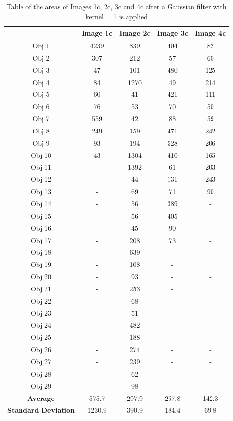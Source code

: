 \documentclass[runningheads]{llncs}
\begin{document}
\begin{table}[h!]
\centering
\begin{tabular}{|c|c|c|c|c|}
\hline
\textbf{} & \textbf{Image 1c} & \textbf{Image 2c} & \textbf{Image 3c} & \textbf{Image 4c} \\
\hline
Obj 1 & 4239   & 839 & 404 &  82 \\ \hline
Obj 2 &  307   & 212  & 57 &  60\\ \hline
Obj 3 &  47    & 101  & 480 &  125\\ \hline
Obj 4 &  84    & 1270  & 49 &  214\\ \hline
Obj 5 &  60    & 41   & 421 &  111\\ \hline
Obj 6 &   76   &  53  & 70 &  50\\ \hline
Obj 7 &  559   &  42     & 88 &  59\\ \hline
Obj 8 &   249  &   159  & 471 &  242 \\ \hline
Obj 9 &  93    &    194   &   528   &  206\\ \hline
Obj 10 & 43    &     1304  &   410  &  165\\ \hline
Obj 11 &  -     &   1392   &   61 &  203\\ \hline
Obj 12 &  -  &     44  &      131  &  243\\ \hline
Obj 13 &  -     &  69   &    71  &  90\\ \hline
Obj 14 &  -  &     56 &    389  &   -\\ \hline
Obj 15 &  -   &    56   &   405   & -  \\ \hline
Obj 16 &  -   &    45 &     90 &   - \\ \hline
Obj 17 &  -    &   208   &   73   & - \\ \hline
Obj 18 &  -   &    639  &    -  &  - \\ \hline
Obj 19 &  -     &    108   &   -   &  \\ \hline
Obj 20 &  - &     93  &  -    & - \\ \hline
Obj 21 &  -     &   253   &    -  &  \\ \hline
Obj 22 & -   &     68  &   -   & - \\ \hline
Obj 23 &  -  &    51   &  -    & - \\ \hline
Obj 24 &  -  &     482  & -     & - \\ \hline
Obj 25 &  -     &  188   &  -    & -  \\ \hline
Obj 26 &  -  &     274  &  -    & - \\ \hline
Obj 27 & -    &    239  &   -   &-  \\ \hline
Obj 28 &  -   &    62  &   -   & - \\ \hline
Obj 29 &  -    &    98   &  -    & - \\ \hline
\textbf{Average} &   575.7  &  297.9   & 257.8   & 142.3  \\ \hline
\textbf{Standard Deviation} &  1230.9   &  390.9   & 184.4   & 69.8  \\ \hline
\end{tabular}
\caption{Table of the areas of Images 1c, 2c, 3c and 4c after a Gaussian filter with kernel = 1 is applied }
\label{tab:Area-SeriesC-Gaussian1}
\end{table}
\end{document}
